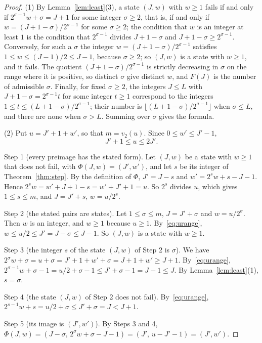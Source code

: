 \documentclass[11pt]{amsart}
\theoremstyle{definition}
\begin{document}
\begin{proof}
(1) By Lemma~\ref{lem:least}(3), a state $(J,w)$ with $w\ge1$ fails if and only if $2^{\sigma-1}w+\sigma=J+1$ for some integer $\sigma\ge2$, that is, if and only if $w=(J+1-\sigma)/2^{\sigma-1}$ for some $\sigma\ge2$; the condition that $w$ is an integer at least $1$ is the condition that $2^{\sigma-1}$ divides $J+1-\sigma$ and $J+1-\sigma\ge2^{\sigma-1}$. Conversely, for such a $\sigma$ the integer $w=(J+1-\sigma)/2^{\sigma-1}$ satisfies $1\le w\le(J-1)/2\le J-1$, because $\sigma\ge2$; so $(J,w)$ is a state with $w\ge1$, and it fails. The quotient $(J+1-\sigma)/2^{\sigma-1}$ is strictly decreasing in $\sigma$ on the range where it is positive, so distinct $\sigma$ give distinct $w$, and $F(J)$ is the number of admissible $\sigma$. Finally, for fixed $\sigma\ge2$, the integers $J\le L$ with $J+1-\sigma=2^{\sigma-1}t$ for some integer $t\ge1$ correspond to the integers $1\le t\le(L+1-\sigma)/2^{\sigma-1}$; their number is $\lfloor(L+1-\sigma)/2^{\sigma-1}\rfloor$ when $\sigma\le L$, and there are none when $\sigma>L$. Summing over $\sigma$ gives the formula.

(2) Put $u=J'+1+w'$, so that $m=v_2(u)$. Since $0\le w'\le J'-1$,
\begin{equation}
\label{eq:urange}
J'+1\le u\le2J'.
\end{equation}

Step 1 (every preimage has the stated form). Let $(J,w)$ be a state with $w\ge1$ that does not fail, with $\Phi(J,w)=(J',w')$, and let $s$ be its integer of Theorem~\ref{thm:step}. By the definition of $\Phi$, $J'=J-s$ and $w'=2^sw+s-J-1$. Hence $2^sw=w'+J+1-s=w'+J'+1=u$. So $2^s$ divides $u$, which gives $1\le s\le m$, and $J=J'+s$, $w=u/2^s$.

Step 2 (the stated pairs are states). Let $1\le\sigma\le m$, $J=J'+\sigma$ and $w=u/2^\sigma$. Then $w$ is an integer, and $w\ge1$ because $u\ge1$. By~\eqref{eq:urange}, $w\le u/2\le J'=J-\sigma\le J-1$. So $(J,w)$ is a state with $w\ge1$.

Step 3 (the integer $s$ of the state $(J,w)$ of Step 2 is $\sigma$). We have $2^\sigma w+\sigma=u+\sigma=J'+1+w'+\sigma=J+1+w'\ge J+1$. By~\eqref{eq:urange}, $2^{\sigma-1}w+\sigma-1=u/2+\sigma-1\le J'+\sigma-1=J-1\le J$. By Lemma~\ref{lem:least}(1), $s=\sigma$.

Step 4 (the state $(J,w)$ of Step 2 does not fail). By~\eqref{eq:urange}, $2^{s-1}w+s=u/2+\sigma\le J'+\sigma=J<J+1$.

Step 5 (its image is $(J',w')$). By Steps 3 and 4, $\Phi(J,w)=(J-\sigma,\,2^\sigma w+\sigma-J-1)=(J',\,u-J'-1)=(J',w')$.


\end{proof}
\end{document}
